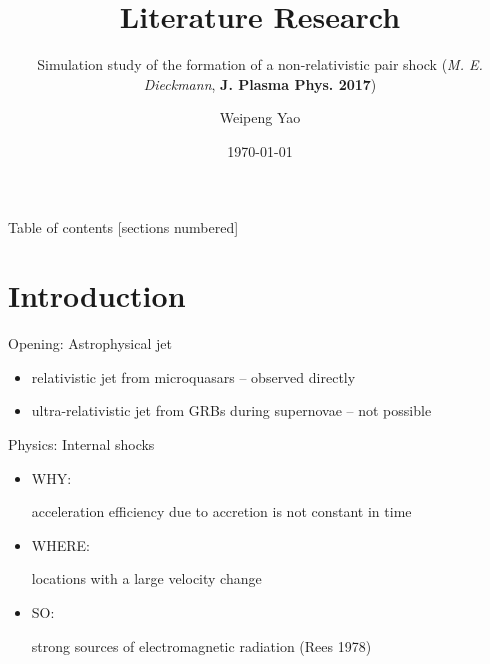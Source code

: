 \documentclass[10pt]{beamer}
\title{Literature Research}
\subtitle{Simulation study of the formation of a non-relativistic pair shock (\emph{M. E. Dieckmann}, \textbf{J. Plasma Phys. 2017})}
\date{\today}
\author{Weipeng Yao}
\institute{Center for Applied Physics and Technology}
\begin{document}
\maketitle

\begin{frame}{Table of contents}
  [sections numbered]
  \tableofcontents[hideallsubsections]
\end{frame}

\section{Introduction}

\begin{frame}[fragile]{Opening: Astrophysical jet}
  
  \begin{itemize}
  
  \item relativistic jet from microquasars -- observed directly
  
  \item ultra-relativistic jet from GRBs during supernovae -- not possible
  
  
  \end{itemize} 

\end{frame}

\begin{frame}[fragile]{Physics: Internal shocks}
  
  \begin{itemize}
  \item WHY:
  
  acceleration efficiency due to accretion is not constant in time
  
  \item WHERE:
  
  locations with a large velocity change
  
  \item SO:
  
  strong sources of electromagnetic radiation (Rees 1978)
  
  \end{itemize}
  
\end{frame}
\end{document}
